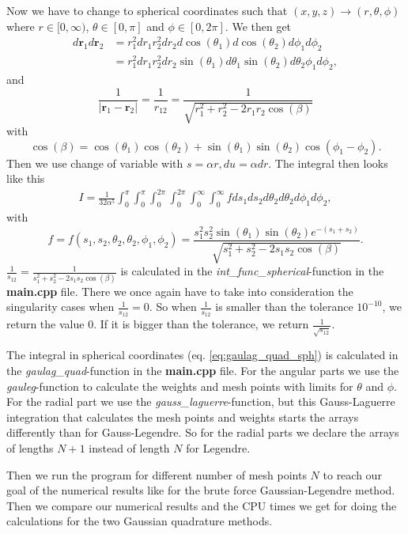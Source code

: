\documentclass[12pt,a4paper,english]{article}
\begin{document}
Now we have to change to spherical coordinates such that $(x,y,z)\rightarrow(r,\theta,\phi)$ where $r\in[0,\infty)$, $\theta\in[0,\pi]$ and $\phi\in[0,2\pi]$. We then get 
\begin{align*}
d\textbf{r}_1d\textbf{r}_2&=r_1^2dr_1r^2_2dr_2d\cos(\theta_1)d\cos(\theta_2)d\phi_1d\phi_2\\
&=r_1^2dr_1r^2_2dr_2\sin(\theta_1)d\theta_1\sin(\theta_2)d\theta_2\phi_1d\phi_2,
\end{align*}
and
\begin{equation*}
\frac{1}{|\textbf{r}_1-\textbf{r}_2|}=\frac{1}{r_{12}}=\frac{1}{\sqrt{r_1^2+r_2^2-2r_1r_2\cos(\beta)}}
\end{equation*}
with 
\[\cos(\beta)=\cos(\theta_1)\cos(\theta_2)+\sin(\theta_1)\sin(\theta_2)\cos(\phi_1-\phi_2).\]
Then we use change of variable with $s=\alpha r,du=\alpha dr$. The integral then looks like this
\begin{align}
\label{eq:gaulag_quad_sph}
I=\frac{1}{32\alpha^5}\int_{0}^{\pi}\int_{0}^{\pi}\int_{0}^{2\pi}\int_{0}^{2\pi}\int_{0}^{\infty}\int_{0}^{\infty}fds_1ds_2d\theta_2d\theta_2d\phi_1d\phi_2,
\end{align}
with \[f=f(s_1,s_2,\theta_2,\theta_2,\phi_1,\phi_2)=\frac{s_1^2s_2^2\sin(\theta_1)\sin(\theta_2)e^{-(s_1+s_2)}}{\sqrt{s_1^2+s_2^2-2s_1s_2\cos(\beta)}}.\]
$\frac{1}{s_{12}}=\frac{1}{s_1^2+s_2^2-2s_1s_2\cos(\beta)}$ is calculated in the \textit{int\_func\_spherical}-function in the \textbf{main.cpp} file. There we once again have to take into consideration the singularity cases when $\frac{1}{s_{12}}=0$. So when $\frac{1}{s_{12}}$ is smaller than the tolerance $10^{-10}$, we return the value 0. If it is bigger than the tolerance, we return $\frac{1}{\sqrt{s_{12}}}$.

The integral in spherical coordinates (eq. \ref{eq:gaulag_quad_sph}) is calculated in the \textit{gaulag\_quad}-function in the \textbf{main.cpp} file. For the angular parts we use the \textit{gauleg}-function to calculate the weights and mesh points with limits for $\theta$ and $\phi$. For the radial part we use the \textit{gauss\_laguerre}-function, but this Gauss-Laguerre integration that calculates the mesh points and weights starts the arrays differently than for Gauss-Legendre. So for the radial parts we declare the arrays of lengths $N+1$ instead of length $N$ for Legendre.

Then we run the program for different number of mesh points $N$ to reach our goal of the numerical results like for the brute force Gaussian-Legendre method. Then we compare our numerical results and the CPU times we get for doing the calculations for the two Gaussian quadrature methods.
\end{document}
